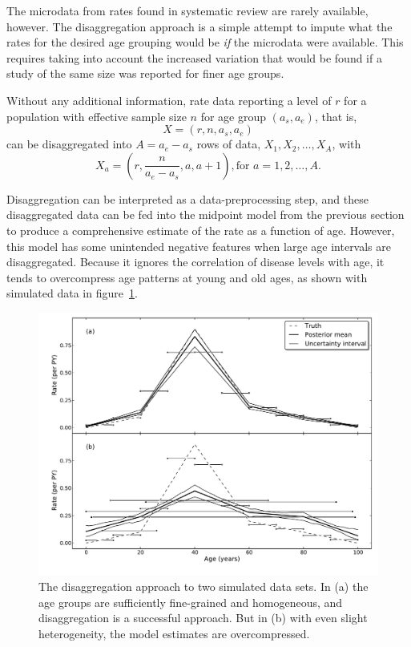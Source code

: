 The microdata from rates found in systematic review are rarely
available, however. The disaggregation approach is a simple attempt to
impute what the rates for the desired age grouping would be \emph{if}
the microdata were available. This requires taking into account the
increased variation that would be found if a study of the same size
was reported for finer age groups.

Without any additional information, rate data reporting a level of $r$
for a population with effective sample size $n$ for age group $(a_s,a_e)$, that is,
\[
X = (r, n, a_s, a_e)
\]
can be disaggregated into $A = a_e-a_s$ rows of
data, $X_1, X_2, \ldots, X_A$, with
\[
X_a = \left(r, \frac{n}{a_e-a_s}, a, a+1\right), \text{for } a=1,2,\ldots,A.
\]

Disaggregation can be interpreted as a data-preprocessing step, and
these disaggregated data can be fed into the midpoint model from the
previous section to produce a comprehensive estimate of the rate as a
function of age. However, this model has some unintended negative
features when large age intervals are disaggregated.  Because it
ignores the correlation of disease levels with age, it tends to
overcompress age patterns at young and old ages, as shown with simulated data in figure~\ref{disagg}.

\begin{figure}[h]
\begin{center}
\includegraphics[width=\textwidth]{age_group_disagg.pdf}
\caption[The disaggregation approach applied to homogeneous and heterogeneous age
  groups.]{The
  disaggregation approach to two simulated data sets.  In (a) the age groups are sufficiently
  fine-grained and homogeneous, and disaggregation is a successful
  approach.  But in (b) with even slight heterogeneity, the model
  estimates are overcompressed.}
\label{disagg}
\end{center}
\end{figure}


